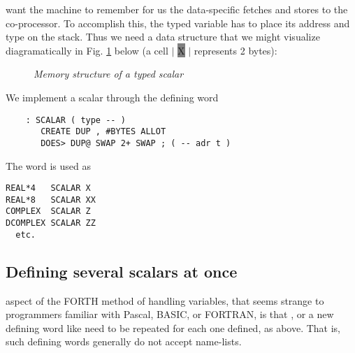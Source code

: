  want the machine to remember for us the data-specific fetches and stores to the co-processor. To accomplish this, the typed variable has to place its address and type on the stack. Thus we need a data structure that we might visualize diagramatically in Fig. \ref{fig:05_01} below (a cell $\mathbf{\big |}$ {\colorbox{gray}{\color{gray}X}}  $\mathbf{\big |}$ represents 2 bytes): 
\begin{figure}
    \center
    \caption{\textit{Memory structure of a typed scalar}}
    \label{fig:05_01}
\end{figure}
 
We implement a scalar through the defining word

\begin{lstlisting}
    : SCALAR ( type -- )
       CREATE DUP , #BYTES ALLOT
       DOES> DUP@ SWAP 2+ SWAP ; ( -- adr t )
\end{lstlisting}

The word  is used as
\begin{lstlisting}
REAL*4   SCALAR X
REAL*8   SCALAR XX
COMPLEX  SCALAR Z
DCOMPLEX SCALAR ZZ
  etc.
\end{lstlisting}

\subsection{Defining several scalars at once}
 aspect of the FORTH method of handling variables, that seems strange to programmers familiar with Pascal, BASIC, or FORTRAN, is that ,  or a new defining word like  need to be repeated for each one defined, as above. That is, such defining words generally do not accept name-lists.

